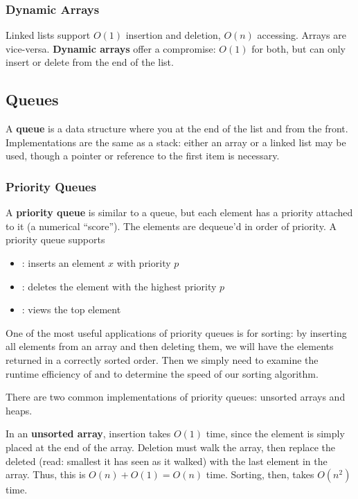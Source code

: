 \documentclass[12pt]{article}
\begin{document}
\subsubsection{Dynamic Arrays}
Linked lists support $O(1)$ insertion and deletion, $O(n)$ accessing. Arrays are vice-versa. {\bf Dynamic arrays} offer a compromise: $O(1)$ for both, but can only insert or delete from the end of the list.

\subsection{Queues}
A {\bf queue} is a data structure where you  at the end of the list and  from the front. Implementations are the same as a stack: either an array or a linked list may be used, though a pointer or reference to the first item is necessary.

\subsubsection{Priority Queues}
A {\bf priority queue} is similar to a queue, but each element has a priority attached to it (a numerical ``score''). The elements are dequeue'd in order of priority. A priority queue supports
\begin{itemize}
\item {}: inserts an element $x$ with priority $p$
\item {}: deletes the element with the highest priority $p$
\item {}: views the top element
\end{itemize}

One of the most useful applications of priority queues is for sorting: by inserting all elements from an array and then deleting them, we will have the elements returned in a correctly sorted order. Then we simply need to examine the runtime efficiency of  and  to determine the speed of our sorting algorithm.

There are two common implementations of priority queues: unsorted arrays and heaps.

In an {\bf unsorted array}, insertion takes $O(1)$ time, since the element is simply placed at the end of the array. Deletion must walk the array, then replace the deleted (read: smallest it has seen as it walked) with the last element in the array. Thus, this is $O(n) + O(1) = O(n)$ time. Sorting, then, takes $O(n^2)$ time.
\end{document}
